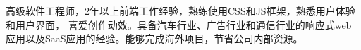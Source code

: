 

\begin{cvparagraph}


高级软件工程师，2年以上前端工作经验，熟练使用CSS和JS框架，熟悉用户体验和用户界面， 喜爱创作动效。具备汽车行业、广告行业和通信行业的响应式web应用以及SaaS应用的经验。能够完成海外项目，节省公司内部资源。


\end{cvparagraph}
